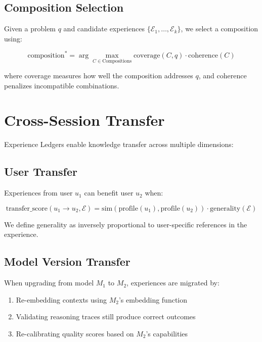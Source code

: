 \documentclass[11pt,letterpaper]{article}
\begin{document}
\subsection{Composition Selection}

Given a problem $q$ and candidate experiences $\{\mathcal{E}_1, \ldots, \mathcal{E}_k\}$, we select a composition using:

\begin{equation}
\text{composition}^* = \arg\max_{C \in \text{Compositions}} \text{coverage}(C, q) \cdot \text{coherence}(C)
\end{equation}

where coverage measures how well the composition addresses $q$, and coherence penalizes incompatible combinations.

\section{Cross-Session Transfer}
\label{sec:transfer}

Experience Ledgers enable knowledge transfer across multiple dimensions:

\subsection{User Transfer}

Experiences from user $u_1$ can benefit user $u_2$ when:

\begin{equation}
\text{transfer\_score}(u_1 \to u_2, \mathcal{E}) = \text{sim}(\text{profile}(u_1), \text{profile}(u_2)) \cdot \text{generality}(\mathcal{E})
\end{equation}

We define generality as inversely proportional to user-specific references in the experience.

\subsection{Model Version Transfer}

When upgrading from model $M_1$ to $M_2$, experiences are migrated by:

\begin{enumerate}
    \item Re-embedding contexts using $M_2$'s embedding function
    \item Validating reasoning traces still produce correct outcomes
    \item Re-calibrating quality scores based on $M_2$'s capabilities
\end{enumerate}
\end{document}
